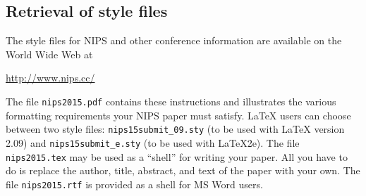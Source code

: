 \documentclass{article} %
\begin{document}






\subsection{Retrieval of style files}

The style files for NIPS and other conference information are available on the World Wide Web at
\begin{center}
   \url{http://www.nips.cc/}
\end{center}
The file \verb+nips2015.pdf+ contains these
instructions and illustrates the
various formatting requirements your NIPS paper must satisfy. \LaTeX{}
users can choose between two style files:
\verb+nips15submit_09.sty+ (to be used with \LaTeX{} version 2.09) and
\verb+nips15submit_e.sty+ (to be used with \LaTeX{}2e). The file
\verb+nips2015.tex+ may be used as a ``shell'' for writing your paper. All you
have to do is replace the author, title, abstract, and text of the paper with
your own. The file
\verb+nips2015.rtf+ is provided as a shell for MS Word users.
\end{document}
